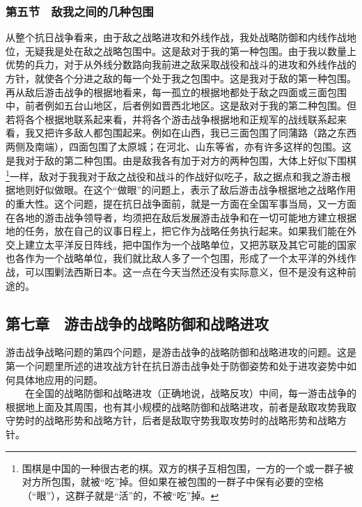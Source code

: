 \documentclass[cn,11pt,chinese]{elegantbook}
\def\myformat#1{\hfil\hfil #1}
\begin{document}
\subsubsection*{\myformat{第五节　敌我之间的几种包围}}
从整个抗日战争看来，由于敌之战略进攻和外线作战，我处战略防御和内线作战地位，无疑我是处在敌之战略包围中。这是敌对于我的第一种包围。由于我以数量上优势的兵力，对于从外线分数路向我前进之敌采取战役和战斗的进攻和外线作战的方针，就使各个分进之敌的每一个处于我之包围中。这是我对于敌的第一种包围。再从敌后游击战争的根据地看来，每一孤立的根据地都处于敌之四面或三面包围中，前者例如五台山地区，后者例如晋西北地区。这是敌对于我的第二种包围。但若将各个根据地联系起来看，并将各个游击战争根据地和正规军的战线联系起来看，我又把许多敌人都包围起来。例如在山西，我已三面包围了同蒲路（路之东西两侧及南端），四面包围了太原城；在河北、山东等省，亦有许多这样的包围。这是我对于敌的第二种包围。由是敌我各有加于对方的两种包围，大体上好似下围棋\footnote[8]{ 围棋是中国的一种很古老的棋。双方的棋子互相包围，一方的一个或一群子被对方所包围，就被“吃”掉。但如果在被包围的一群子中保有必要的空格（“眼”），这群子就是“活”的，不被“吃”掉。}一样，敌对于我我对于敌之战役和战斗的作战好似吃子，敌之据点和我之游击根据地则好似做眼。在这个“做眼”的问题上，表示了敌后游击战争根据地之战略作用的重大性。这个问题，提在抗日战争面前，就是一方面在全国军事当局，又一方面在各地的游击战争领导者，均须把在敌后发展游击战争和在一切可能地方建立根据地的任务，放在自己的议事日程上，把它作为战略任务执行起来。如果我们能在外交上建立太平洋反日阵线，把中国作为一个战略单位，又把苏联及其它可能的国家也各作为一个战略单位，我们就比敌人多了一个包围，形成了一个太平洋的外线作战，可以围剿法西斯日本。这一点在今天当然还没有实际意义，但不是没有这种前途的。\\
\subsection*{\myformat{第七章　游击战争的战略防御和战略进攻}}
游击战争战略问题的第四个问题，是游击战争的战略防御和战略进攻的问题。这是第一个问题里所述的进攻战方针在抗日游击战争处于防御姿势和处于进攻姿势中如何具体地应用的问题。\\
　　在全国的战略防御和战略进攻（正确地说，战略反攻）中间，每一游击战争的根据地上面及其周围，也有其小规模的战略防御和战略进攻，前者是敌取攻势我取守势时的战略形势和战略方针，后者是敌取守势我取攻势时的战略形势和战略方针。\\
\end{document}
